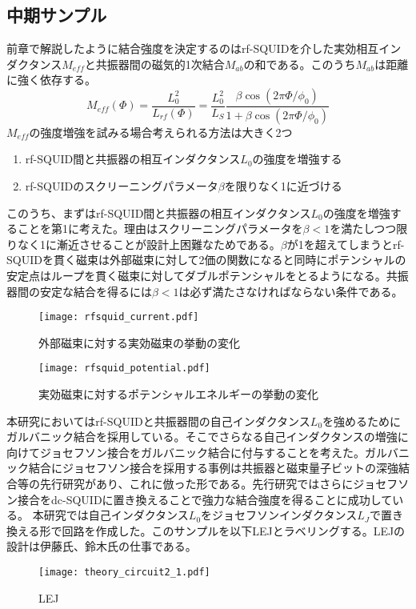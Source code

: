 \subsection{中期サンプル}
前章で解説したように結合強度を決定するのはrf-SQUIDを介した実効相互インダクタンス$M_{eff}$と共振器間の磁気的1次結合$M_{ab}$の和である。このうち$M_{ab}$は距離に強く依存する。
\begin{equation}
    M_{eff}(\Phi)  = \frac{L_0^2}{L_{rf}(\Phi)}=\frac{L_0^2}{L_{S}} \frac{\beta \cos \left(2 \pi \Phi/\phi_{0}\right)}{1+\beta \cos \left(2 \pi \Phi/\phi_{0}\right)}
\end{equation}
$M_{eff}$の強度増強を試みる場合考えられる方法は大きく2つ
\begin{enumerate}
    \item rf-SQUID間と共振器の相互インダクタンス$L_0$の強度を増強する
    \item rf-SQUIDのスクリーニングパラメータ$\beta$を限りなく1に近づける
 \end{enumerate}
このうち、まずはrf-SQUID間と共振器の相互インダクタンス$L_0$の強度を増強することを第1に考えた。理由はスクリーニングパラメータを$\beta<1$を満たしつつ限りなく1に漸近させることが設計上困難なためである。$\beta$が1を超えてしまうとrf-SQUIDを貫く磁束は外部磁束に対して2価の関数になると同時にポテンシャルの安定点はループを貫く磁束に対してダブルポテンシャルをとるようになる。共振器間の安定な結合を得るには$\beta<1$は必ず満たさなければならない条件である。
\begin{figure}[H]
    \begin{minipage}[t]{0.5\columnwidth}
        \centering
        \texttt{[image: rfsquid\_current.pdf]}
        \caption{外部磁束に対する実効磁束の挙動の変化}
    \end{minipage}%
    \begin{minipage}[t]{0.5\columnwidth}
        \centering
        \texttt{[image: rfsquid\_potential.pdf]}
        \caption{実効磁束に対するポテンシャルエネルギーの挙動の変化}
    \end{minipage}
\end{figure}
本研究においてはrf-SQUIDと共振器間の自己インダクタンス$L_0$を強めるためにガルバニック結合を採用している。そこでさらなる自己インダクタンスの増強に向けてジョセフソン接合をガルバニック結合に付与することを考えた。ガルバニック結合にジョセフソン接合を採用する事例は共振器と磁束量子ビットの深強結合等の先行研究\cite*{Yoshihara2017}があり、これに倣った形である。先行研究ではさらにジョセフソン接合をdc-SQUIDに置き換えることで強力な結合強度を得ることに成功している。
本研究では自己インダクタンス$L_0$をジョセフソンインダクタンス$L_J$で置き換える形で回路を作成した。このサンプルを以下LEJとラベリングする。LEJの設計は伊藤氏、鈴木氏の仕事である。
\begin{figure}[H]
    \centering
    \texttt{[image: theory\_circuit2\_1.pdf]}
    \caption{LEJ}
\end{figure}
